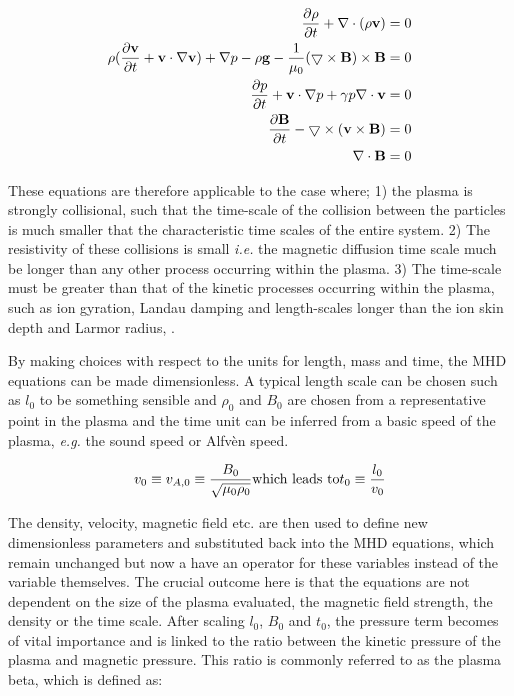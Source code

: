 \begin{align}
	\frac{\partial \rho}{\partial t } + \nabla\cdot(\rho\mathbf{v}) &= 0 \\
	\rho(\frac{\partial \mathbf{v}}{\partial t } + \mathbf{v}\cdot\nabla\mathbf{v}) + \nabla p - \rho\mathbf{g} - \frac{1}{\mu_0}(\bigtriangledown \times \mathbf{B}) \times \mathbf{B} &= 0\\
	\frac{\partial p}{\partial t } + \mathbf{v}\cdot\nabla p + \gamma p\nabla\cdot\mathbf{v} &= 0\\
	\frac{\partial \mathbf{B}}{\partial t } - \bigtriangledown \times (\mathbf{v} \times \mathbf{B}) &= 0\\
	\nabla\cdot\mathbf{B} &= 0
\end{align}

\noindent These equations are therefore applicable to the case where; 1) the plasma is strongly collisional, such that the time-scale of the collision between the particles is much smaller that the characteristic time scales of the entire system.
2) The resistivity of these collisions is small \emph{i.e.} the magnetic diffusion time scale much be longer than any other process occurring within the plasma.
3) The time-scale must be greater than that of the kinetic processes occurring within the plasma, such as ion gyration, Landau damping and length-scales longer than the ion skin depth and Larmor radius, \cite{Goedbloed2004}.

By making choices with respect to the units for length, mass and time, the MHD equations can be made dimensionless.
A typical length scale can be chosen such as $l_0$ to be something sensible and $\rho_0$ and $B_0$ are chosen from a representative point in the plasma and the time unit can be inferred from a basic speed of the plasma, \emph{e.g.} the sound speed or Alfv{\`e}n speed.

\begin{equation}
	v_0 \equiv v_{A,0} \equiv \frac{B_0}{\sqrt{\mu_0\rho_0}} \textnormal{which leads to} t_0 \equiv \frac{l_0}{v_0} 
\end{equation}

\noindent The density, velocity, magnetic field etc. are then used to define new dimensionless parameters and substituted back into the MHD equations, which remain unchanged but now a have an operator for these variables instead of the variable themselves.
The crucial outcome here is that the equations are not dependent on the size of the plasma evaluated, the magnetic field strength, the density or the time scale.
After scaling $l_0$, $B_0$ and $t_0$, the pressure term becomes of vital importance and is linked to the ratio between the kinetic pressure of the plasma and magnetic pressure.
This ratio is commonly referred to as the plasma beta, which is defined as:

